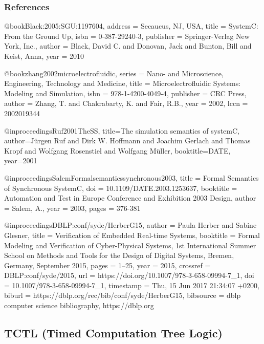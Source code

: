 \subsubsection{References}

@book{Black:2005:SGU:1197604,
  address = {Secaucus, NJ, USA},
  title = {{{SystemC}}: {{From}} the {{Ground Up}}},
  isbn = {0-387-29240-3},
  publisher = {{Springer-Verlag New York, Inc.}},
  author = {Black, David C. and Donovan, Jack and Bunton, Bill and Keist, Anna},
  year = {2010}
}

@book{zhang2002microelectrofluidic,
  series = {Nano- and Microscience, Engineering, Technology and Medicine},
  title = {Microelectrofluidic {{Systems}}: {{Modeling}} and {{Simulation}}},
  isbn = {978-1-4200-4049-4},
  publisher = {{CRC Press}},
  author = {Zhang, T. and Chakrabarty, K. and Fair, R.B.},
  year = {2002},
  lccn = {2002019344}
}

@inproceedings{Ruf2001TheSS,
  title={The simulation semantics of systemC},
  author={J{\"u}rgen Ruf and Dirk W. Hoffmann and Joachim Gerlach and Thomas Kropf and Wolfgang Rosenstiel and Wolfgang M{\"u}ller},
  booktitle={DATE},
  year={2001}
}


@inproceedings{SalemFormalsemanticssynchronous2003,
  title = {Formal Semantics of Synchronous {{SystemC}}},
  doi = {10.1109/DATE.2003.1253637},
  booktitle = {Automation and {{Test}} in {{Europe Conference}} and {{Exhibition}} 2003 {{Design}}},
  author = {Salem, A.},
  year = {2003},
  pages = {376-381}
}

@inproceedings{DBLP:conf/syde/HerberG15,
  author    = {Paula Herber and
               Sabine Glesner},
  title     = {Verification of Embedded Real-time Systems},
  booktitle = {Formal Modeling and Verification of Cyber-Physical Systems, 1st International
               Summer School on Methods and Tools for the Design of Digital Systems,
               Bremen, Germany, September 2015},
  pages     = {1--25},
  year      = {2015},
  crossref  = {DBLP:conf/syde/2015},
  url       = {https://doi.org/10.1007/978-3-658-09994-7_1},
  doi       = {10.1007/978-3-658-09994-7_1},
  timestamp = {Thu, 15 Jun 2017 21:34:07 +0200},
  biburl    = {https://dblp.org/rec/bib/conf/syde/HerberG15},
  bibsource = {dblp computer science bibliography, https://dblp.org}
}




\subsection{TCTL (Timed Computation Tree Logic)}
\label{subsecL:TCTL}

